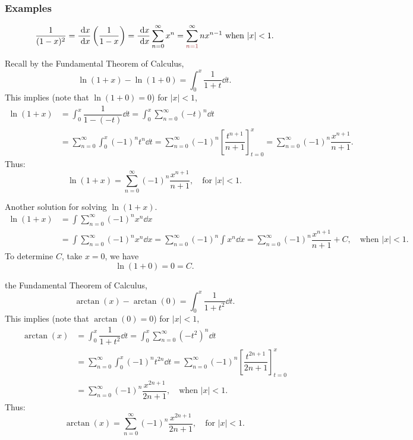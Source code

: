 \subsubsection{Examples}
\begin{ex}
    \begin{align*}
        \dfrac{1}{(1-x)^2} = \dfrac{\dd x}{\dd x} \left(\dfrac{1}{1-x} \right) = \dfrac{\dd x}{\dd x} \sum_{n=0}^\infty x^n = \sum_{\red{n=1}}^\infty n x^{n-1} \text{ when } |x| < 1.
    \end{align*}
\end{ex}


\begin{ex}
    Recall by the Fundamental Theorem of Calculus, 
    \[ \ln(1+x) - \ln (1+0) = \int_0^x \dfrac{1}{1+t} \dd t.\] 
    This implies (note that $\ln (1+0) = 0$) for $|x| < 1$,
    \begin{align*}
        \ln(1+x) &= \int_0^x \dfrac{1}{1-(-t)} \dd t = \int_0^x \sum_{n=0}^\infty (-t)^n \dd t \\
        &= \sum_{n=0}^\infty  \int_0^x (-1)^n t^n \dd t = \sum_{n=0}^\infty (-1)^n \left[ \dfrac{t^{n+1}}{n+1}\right]_{t=0}^x = \sum_{n=0}^\infty (-1)^n  \dfrac{x^{n+1}}{n+1}.
    \end{align*}
    Thus:
    \[\ln(1+x)= \sum_{n=0}^\infty (-1)^n \dfrac{x^{n+1}}{n+1}, \quad \text{for } |x| < 1.\]
\end{ex}

\begin{ex}
Another solution for solving $\ln(1+x)$.
\begin{align*}
    \ln(1+x) &= \int \sum_{n=0}^{\infty} (-1)^n x^n \dd x \tag{Take $u = -t$, need $|u| = |-t|<1$, i.e. $|t|<1$}\\
    &=\int \sum_{n=0}^{\infty} (-1)^n x^n \dd x =\sum_{n=0}^{\infty} (-1)^n \int x^n\dd x =\sum_{n=0}^{\infty} (-1)^n \dfrac{x^{n+1}}{n+1} + C, \quad \text{when } |x| < 1.
\end{align*}
To determine $C$, take $x = 0$, we have
\[\ln(1+0) = 0 = C.\]
\end{ex}

\begin{ex}[$\arctan(x)$]
the Fundamental Theorem of Calculus, 
    \[ \arctan(x) - \arctan(0) = \int_0^x \dfrac{1}{1+t^2} \dd t.\] 
    This implies (note that $\arctan(0) = 0$) for $|x| < 1$,
    \begin{align*}
        \arctan(x) &= \int_0^x \dfrac{1}{1+t^2} \dd t = \int_0^x \sum_{n=0}^\infty (-t^2)^n \dd t \\
        &= \sum_{n=0}^\infty  \int_0^x (-1)^n t^{2n} \dd t = \sum_{n=0}^\infty (-1)^n \left[ \dfrac{t^{2n+1}}{2n+1}\right]_{t=0}^x \\
        &= \sum_{n=0}^{\infty} (-1)^n \dfrac{x^{2n+1}}{2n+1}, \quad \text{when } |x| < 1.
    \end{align*}
    Thus:
    \[\arctan(x) = \sum_{n=0}^{\infty} (-1)^n \dfrac{x^{2n+1}}{2n+1}, \quad \text{for } |x| < 1.\]
\end{ex}

